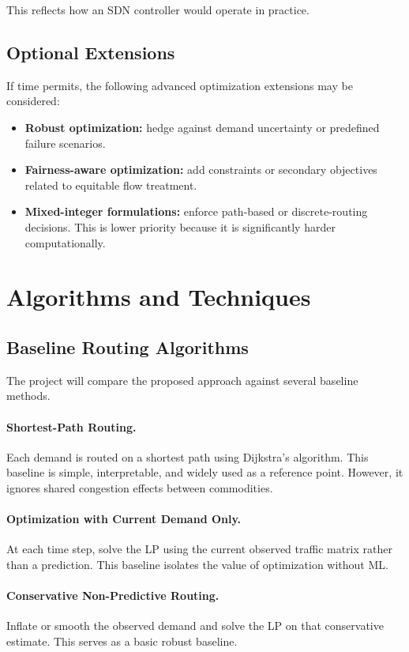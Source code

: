 \documentclass[11pt]{article}
\begin{document}
This reflects how an SDN controller would operate in practice.

\subsection{Optional Extensions}
If time permits, the following advanced optimization extensions may be considered:
\begin{itemize}
    \item \textbf{Robust optimization:} hedge against demand uncertainty or predefined failure scenarios.
    \item \textbf{Fairness-aware optimization:} add constraints or secondary objectives related to equitable flow treatment.
    \item \textbf{Mixed-integer formulations:} enforce path-based or discrete-routing decisions. This is lower priority because it is significantly harder computationally.
\end{itemize}

\section{Algorithms and Techniques}
\subsection{Baseline Routing Algorithms}
The project will compare the proposed approach against several baseline methods.

\paragraph{Shortest-Path Routing.}
Each demand is routed on a shortest path using Dijkstra's algorithm. This baseline is simple, interpretable, and widely used as a reference point. However, it ignores shared congestion effects between commodities.

\paragraph{Optimization with Current Demand Only.}
At each time step, solve the LP using the current observed traffic matrix rather than a prediction. This baseline isolates the value of optimization without ML.

\paragraph{Conservative Non-Predictive Routing.}
Inflate or smooth the observed demand and solve the LP on that conservative estimate. This serves as a basic robust baseline.
\end{document}

